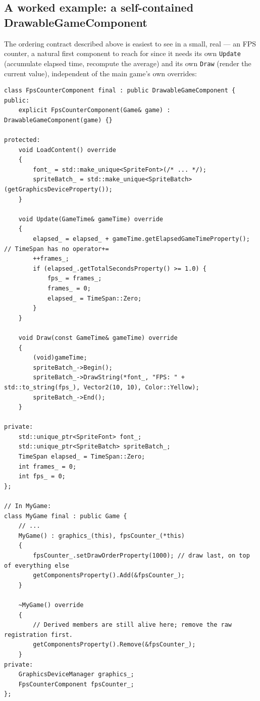 \subsection{A worked example: a self-contained DrawableGameComponent}

The ordering contract described above is easiest to see in a small, real
 --- an FPS counter, a natural first component to reach for
since it needs its own \texttt{Update} (accumulate elapsed time, recompute the average) and its
own \texttt{Draw} (render the current value), independent of the main game's own overrides:

\begin{lstlisting}
class FpsCounterComponent final : public DrawableGameComponent {
public:
    explicit FpsCounterComponent(Game& game) : DrawableGameComponent(game) {}

protected:
    void LoadContent() override
    {
        font_ = std::make_unique<SpriteFont>(/* ... */);
        spriteBatch_ = std::make_unique<SpriteBatch>(getGraphicsDeviceProperty());
    }

    void Update(GameTime& gameTime) override
    {
        elapsed_ = elapsed_ + gameTime.getElapsedGameTimeProperty(); // TimeSpan has no operator+=
        ++frames_;
        if (elapsed_.getTotalSecondsProperty() >= 1.0) {
            fps_ = frames_;
            frames_ = 0;
            elapsed_ = TimeSpan::Zero;
        }
    }

    void Draw(const GameTime& gameTime) override
    {
        (void)gameTime;
        spriteBatch_->Begin();
        spriteBatch_->DrawString(*font_, "FPS: " + std::to_string(fps_), Vector2(10, 10), Color::Yellow);
        spriteBatch_->End();
    }

private:
    std::unique_ptr<SpriteFont> font_;
    std::unique_ptr<SpriteBatch> spriteBatch_;
    TimeSpan elapsed_ = TimeSpan::Zero;
    int frames_ = 0;
    int fps_ = 0;
};

// In MyGame:
class MyGame final : public Game {
    // ...
    MyGame() : graphics_(this), fpsCounter_(*this)
    {
        fpsCounter_.setDrawOrderProperty(1000); // draw last, on top of everything else
        getComponentsProperty().Add(&fpsCounter_);
    }

    ~MyGame() override
    {
        // Derived members are still alive here; remove the raw registration first.
        getComponentsProperty().Remove(&fpsCounter_);
    }
private:
    GraphicsDeviceManager graphics_;
    FpsCounterComponent fpsCounter_;
};
\end{lstlisting}

